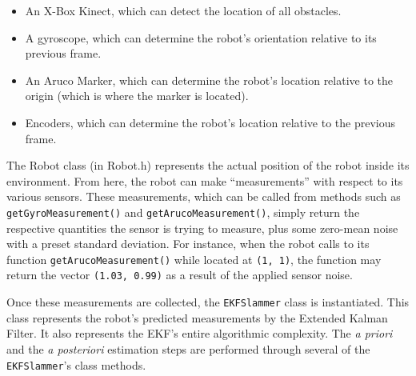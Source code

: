 \documentclass[journal]{IEEEtran}
\begin{document}
\begin{itemize}
 \item An X-Box Kinect, which can detect the location of all obstacles.
 \item A gyroscope, which can determine the robot’s orientation relative to its previous frame.
 \item An Aruco Marker, which can determine the robot’s location relative to the origin (which is 
       where the marker is located).
 \item Encoders, which can determine the robot’s location relative to the previous frame. 
\end{itemize}

The Robot class (in Robot.h) represents the actual position of the robot inside its environment. 
From here, the robot can make ``measurements'' with respect to its various sensors. These 
measurements, which can be called from methods such as \texttt{getGyroMeasurement()} and 
\texttt{getArucoMeasurement()}, simply return the respective quantities the sensor is trying to 
measure, plus some zero-mean noise with a preset standard deviation. For instance, when the 
robot calls to its function \texttt{getArucoMeasurement()} while located at \texttt{(1, 1)}, the 
function may return the vector \texttt{(1.03, 0.99)} as a result of the applied sensor noise. 

Once these measurements are collected, the \texttt{EKFSlammer} class is instantiated. This class 
represents the robot's predicted measurements by the Extended Kalman Filter. It also represents 
the EKF's entire algorithmic complexity. The \textit{a priori} and the \textit{a posteriori} estimation steps are 
performed through several of the \texttt{EKFSlammer}'s class methods. 
\end{document}
